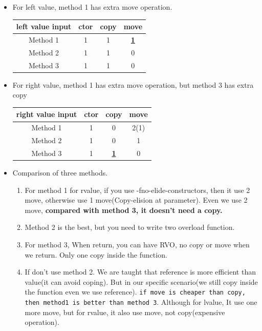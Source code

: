 \documentclass[a4paper,11pt,twoside]{book}
\begin{document}
\begin{itemize}
\item For left value, method 1 has extra move operation.

\begin{tabular}{|c|c|c|c|}
	\hline
	left value input	& ctor & copy & move  \\
	\hline
	Method 1 & 1 & 1 & \textbf{\underline{1}} \\
	\hline
	Method 2&  1& 1 & 0  \\
	\hline
	Method 3&  1&  1& 0 \\
	\hline
\end{tabular}

\item For right value, method 1 has extra move operation, but method 3 has extra copy

\begin{tabular}{|c|c|c|c|}
	\hline
	right value input	& ctor & copy & move  \\
	\hline
	Method 1 & 1 & 0 & 2(1)  \\
	\hline
	Method 2 & 1 & 0 & 1 \\
	\hline
	Method 3 & 1 & \textbf{\underline{1}} & 0 \\
	\hline
\end{tabular}


\item Comparison of three methods. 
\begin{enumerate}
	\item For method 1 for rvalue,  if you use -fno-elide-constructors, then it use 2 move, otherwise use 1 move(Copy-elision at parameter). Even we use 2 move, \textbf{compared with method 3, it doesn't need a copy.}
	
	\item Method 2 is the best, but you need to write two overload function.
	
	\item For method 3, When return, you can have RVO, no copy or move when we return. Only one copy inside the function.
	
	\item If don’t use method 2.  We are taught that reference is more efficient than value(it can avoid coping). But in our specific scenario(we still copy inside the function even we use reference). \texttt{if move is cheaper than copy, then method1 is better than method 3}. Although for lvalue, It use one more move, but for rvalue, it also use move, not copy(expensive operation).
	  
\end{enumerate}



\end{itemize}
\end{document}
